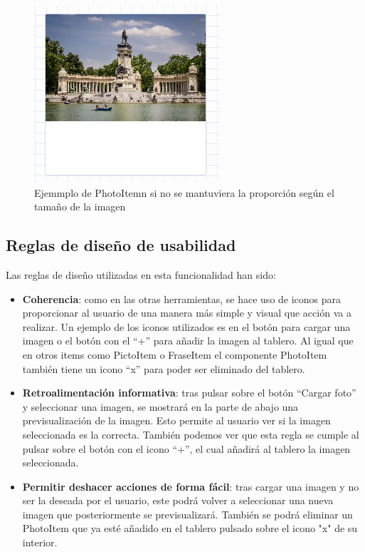 \begin{figure}[h!]
	\centering
	\includegraphics[width=0.7\linewidth]{Imagenes/Bitmap/photoItemError}
	\caption{Ejemmplo de PhotoItemn si no se mantuviera la proporción según el tamaño de la imagen}
	\label{fig:photoitemerror}
\end{figure}

\subsection{Reglas de diseño de usabilidad}

 Las reglas de diseño utilizadas en esta funcionalidad han sido:
\begin{itemize}
	\item \textbf{Coherencia}: como en las otras herramientas, se hace uso de iconos para proporcionar al usuario de una manera más simple y visual que acción va a realizar. Un ejemplo de los iconos utilizados es en el botón para cargar una imagen o el botón con el “+” para añadir la imagen al tablero. Al igual que en otros items como PictoItem o FraseItem el componente PhotoItem también tiene un icono “x” para poder ser eliminado del tablero.
	
	\item \textbf{Retroalimentación informativa}: tras pulsar sobre el botón “Cargar foto” y seleccionar una imagen, se mostrará en la parte de abajo una previsualización de la imagen. Esto permite al usuario ver si la imagen seleccionada es la correcta.
	También podemos ver que esta regla se cumple al pulsar sobre el botón con el icono “+”, el cual añadirá al tablero la imagen seleccionada.
	
	
	\item \textbf{Permitir deshacer acciones de forma fácil}:  tras cargar una imagen y no ser la deseada por el usuario, este podrá volver a seleccionar una nueva imagen que posteriormente se previsualizará. También se podrá eliminar un PhotoItem que ya esté añadido en el tablero pulsado sobre el icono "x" de su interior.
	
\end{itemize}



